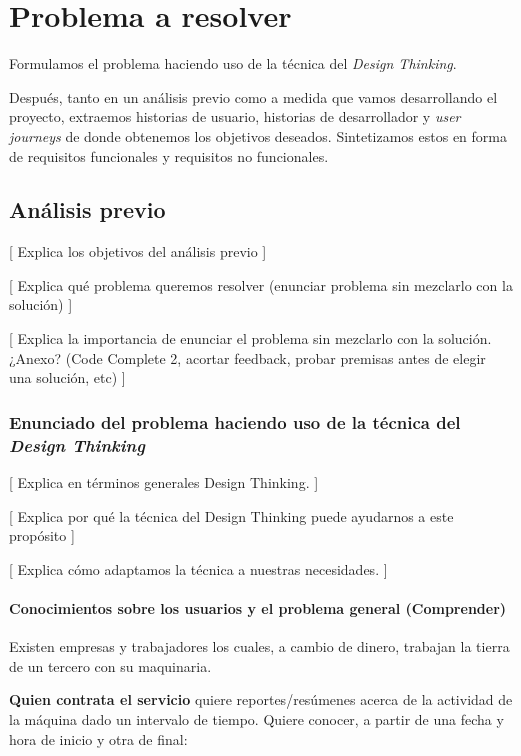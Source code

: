 \chapter{Problema a resolver}

Formulamos el problema haciendo uso de la técnica del \textit{Design Thinking}.

Después, tanto en un análisis previo como a medida que vamos desarrollando el 
proyecto, extraemos historias de usuario, historias de desarrollador y
\textit{user journeys} de donde obtenemos los objetivos deseados. Sintetizamos
estos en forma de requisitos funcionales y requisitos no funcionales.

\section{Análisis previo}

[ Explica los objetivos del análisis previo ]

[ Explica qué problema queremos resolver (enunciar problema sin mezclarlo con la solución) ]

[ Explica la importancia de enunciar el problema sin mezclarlo con la solución. ¿Anexo? (Code Complete 2, acortar feedback, probar premisas antes de elegir una solución, etc) ]

\subsection{Enunciado del problema haciendo uso de la técnica del \textit{Design Thinking}}

[ Explica en términos generales Design Thinking. ]

[ Explica por qué la técnica del Design Thinking puede ayudarnos a este propósito ]

[ Explica cómo adaptamos la técnica a nuestras necesidades. ]

\subsubsection{Conocimientos sobre los usuarios y el problema general (Comprender)}

Existen empresas y trabajadores los cuales, a cambio de dinero, trabajan la
tierra de un tercero con su maquinaria.

\textbf{Quien contrata el servicio} quiere reportes/resúmenes acerca de la actividad
de la máquina dado un intervalo de tiempo. Quiere conocer, a partir de una fecha y hora de inicio y otra de final:

